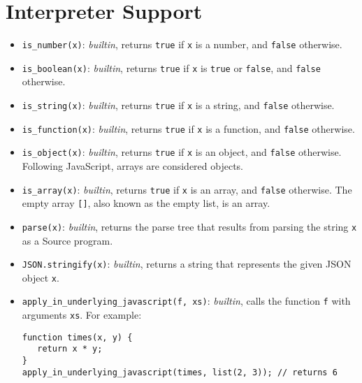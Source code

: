 \section*{Interpreter Support}

\begin{itemize}
\item \lstinline{is_number(x)}: \textit{builtin}, returns \lstinline{true} if \lstinline{x} is a number, and 
\lstinline{false} otherwise.
\item \lstinline{is_boolean(x)}: \textit{builtin}, returns \lstinline{true} if \lstinline{x} is \lstinline{true} or \lstinline{false}, and \lstinline{false} otherwise.
\item \lstinline{is_string(x)}: \textit{builtin}, returns \lstinline{true} if \lstinline{x} is a
string, and \lstinline{false} otherwise.
\item \lstinline{is_function(x)}: \textit{builtin}, returns \lstinline{true} if \lstinline{x} is a
function, and \lstinline{false} otherwise.
\item \lstinline{is_object(x)}: \textit{builtin}, returns \lstinline{true} if \lstinline{x} is an
object, and \lstinline{false} otherwise. Following JavaScript, arrays are considered
objects.
\item \lstinline{is_array(x)}: \textit{builtin}, returns \lstinline{true} if \lstinline{x} is an
array, and \lstinline{false} otherwise. The empty array \lstinline{[]}, also known
as the empty list, is an array.
\item \lstinline{parse(x)}: \textit{builtin}, returns the parse tree that results from parsing
the string \lstinline{x} as a Source program.
\item \lstinline{JSON.stringify(x)}: \textit{builtin}, returns a string that represents the given JSON object
\lstinline{x}.
\item \lstinline{apply_in_underlying_javascript(f, xs)}: \textit{builtin}, calls the function \lstinline{f}
with arguments \lstinline{xs}. For example:
\begin{lstlisting}
function times(x, y) {
   return x * y;
}
apply_in_underlying_javascript(times, list(2, 3)); // returns 6
\end{lstlisting}
\end{itemize}
